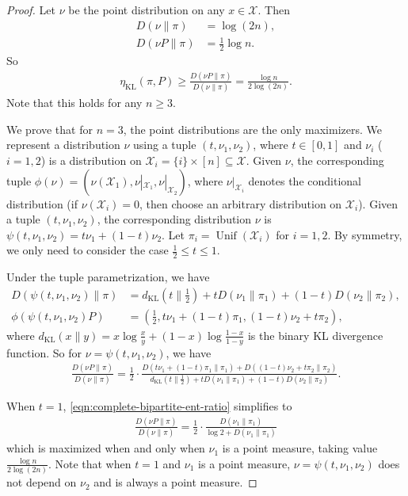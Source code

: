 \documentclass[11pt]{article}
\def\cX{\mathcal{X}}
\DeclareMathOperator\Unif{\mathrm{Unif}}
\DeclareMathOperator\KL{\mathrm{KL}}
\theoremstyle{definition}
\begin{document}
\begin{proof}
  Let $\nu$ be the point distribution on any $x\in \cX$.
  Then
  \begin{align}
    D(\nu \| \pi) &= \log(2n),\\
    D(\nu P \| \pi) &= \frac 12 \log n.
  \end{align}
  So
  \begin{align}
    \eta_{\KL}(\pi, P) \ge \frac{D(\nu P \| \pi)}{D(\nu \| \pi)} = \frac{\log n}{2\log(2n)}.
  \end{align}
  Note that this holds for any $n\ge 3$.

  We prove that for $n=3$, the point distributions are the only maximizers.
  We represent a distribution $\nu$ using a tuple $(t,\nu_1,\nu_2)$, where $t\in [0,1]$ and $\nu_i$ ($i=1,2$) is a distribution on $\cX_i=\{i\}\times [n] \subseteq \cX$.
  Given $\nu$, the corresponding tuple $\phi(\nu) = (\nu(\cX_1), \nu|_{\cX_1}, \nu|_{\cX_2})$, where $\nu|_{\cX_i}$ denotes the conditional distribution (if $\nu(\cX_i)=0$, then choose an arbitrary distribution on $\cX_i$).
  Given a tuple $(t,\nu_1,\nu_2)$, the corresponding distribution $\nu$ is $\psi(t,\nu_1,\nu_2) = t \nu_1 + (1-t) \nu_2$.
  Let $\pi_i=\Unif(\cX_i)$ for $i=1,2$. By symmetry, we only need to consider the case $\frac 12 \le t \le 1$.

  Under the tuple parametrization, we have
  \begin{align}
    D(\psi(t,\nu_1,\nu_2) \| \pi) &= d_{\KL}\left(t\|\frac 12\right) + t D(\nu_1 \| \pi_1) + (1-t) D(\nu_2 \| \pi_2),\\
    \phi(\psi(t,\nu_1,\nu_2) P) &= \left(\frac 12, t \nu_1 + (1-t) \pi_1, (1-t) \nu_2 + t \pi_2\right),
  \end{align}
  where $d_{\KL}(x\|y) = x \log \frac x y + (1-x) \log \frac {1-x}{1-y}$ is the binary KL divergence function.
  So for $\nu = \psi(t,\nu_1,\nu_2)$, we have
  \begin{align} \label{eqn:complete-bipartite-ent-ratio}
    \frac{D(\nu P\| \pi)}{D(\nu \| \pi)} = \frac 12 \cdot \frac{D(t \nu_1 + (1-t) \pi_1 \| \pi_1) + D((1-t) \nu_2 + t \pi_2 \| \pi_2)}{d_{\KL}\left(t\|\frac 12\right) + t D(\nu_1 \| \pi_1) + (1-t) D(\nu_2 \| \pi_2)}.
  \end{align}

  When $t=1$, \cref{eqn:complete-bipartite-ent-ratio} simplifies to
  \begin{align}
    \frac{D(\nu P\| \pi)}{D(\nu \| \pi)} = \frac 12 \cdot \frac{D(\nu_1 \| \pi_1)}{\log 2 + D(\nu_1 \| \pi_1)}
  \end{align}
  which is maximized when and only when $\nu_1$ is a point measure, taking value $\frac{\log n}{2\log(2n)}$.
  Note that when $t=1$ and $\nu_1$ is a point measure, $\nu=\psi(t,\nu_1,\nu_2)$ does not depend on $\nu_2$ and is always a point measure.


\end{proof}
\end{document}
